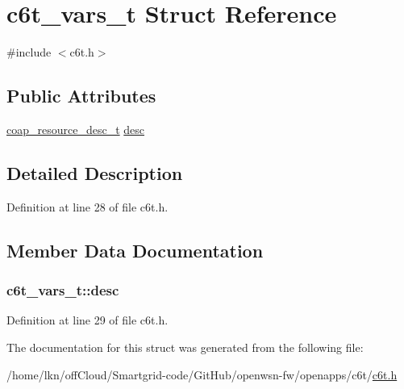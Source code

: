 \hypertarget{structc6t__vars__t}{}\section{c6t\+\_\+vars\+\_\+t Struct Reference}
\label{structc6t__vars__t}


{\ttfamily \#include $<$c6t.\+h$>$}

\subsection*{Public Attributes}
\begin{DoxyCompactItemize}
\item 
\hyperlink{structcoap__resource__desc__t}{coap\+\_\+resource\+\_\+desc\+\_\+t} \hyperlink{structc6t__vars__t_ab1501c601c160b28922a3979fa045a58}{desc}
\end{DoxyCompactItemize}


\subsection{Detailed Description}


Definition at line 28 of file c6t.\+h.



\subsection{Member Data Documentation}
\subsubsection[{\texorpdfstring{desc}{desc}}]{ c6t\+\_\+vars\+\_\+t\+::desc}\hypertarget{structc6t__vars__t_ab1501c601c160b28922a3979fa045a58}{}\label{structc6t__vars__t_ab1501c601c160b28922a3979fa045a58}


Definition at line 29 of file c6t.\+h.



The documentation for this struct was generated from the following file\+:\begin{DoxyCompactItemize}
\item 
/home/lkn/off\+Cloud/\+Smartgrid-\/code/\+Git\+Hub/openwsn-\/fw/openapps/c6t/\hyperlink{c6t_8h}{c6t.\+h}\end{DoxyCompactItemize}
